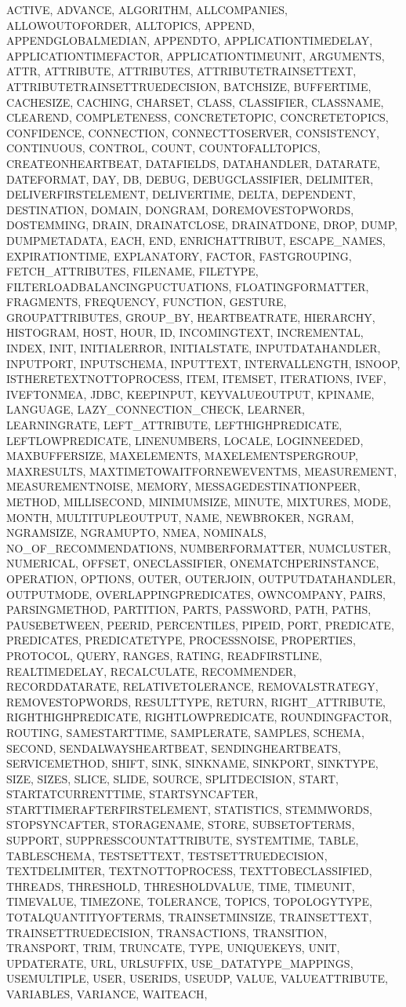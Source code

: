 {{ACTIVE, ADVANCE, ALGORITHM, ALLCOMPANIES, ALLOWOUTOFORDER, ALLTOPICS, APPEND, APPENDGLOBALMEDIAN, APPENDTO, APPLICATIONTIMEDELAY, APPLICATIONTIMEFACTOR, APPLICATIONTIMEUNIT, ARGUMENTS, ATTR, ATTRIBUTE, ATTRIBUTES, ATTRIBUTETRAINSETTEXT, ATTRIBUTETRAINSETTRUEDECISION, BATCHSIZE, BUFFERTIME, CACHESIZE, CACHING, CHARSET, CLASS, CLASSIFIER, CLASSNAME, CLEAREND, COMPLETENESS, CONCRETETOPIC, CONCRETETOPICS, CONFIDENCE, CONNECTION, CONNECTTOSERVER, CONSISTENCY, CONTINUOUS, CONTROL, COUNT, COUNTOFALLTOPICS, CREATEONHEARTBEAT, DATAFIELDS, DATAHANDLER, DATARATE, DATEFORMAT, DAY, DB, DEBUG, DEBUGCLASSIFIER, DELIMITER, DELIVERFIRSTELEMENT, DELIVERTIME, DELTA, DEPENDENT, DESTINATION, DOMAIN, DONGRAM, DOREMOVESTOPWORDS, DOSTEMMING, DRAIN, DRAINATCLOSE, DRAINATDONE, DROP, DUMP, DUMPMETADATA, EACH, END, ENRICHATTRIBUT, ESCAPE_NAMES, EXPIRATIONTIME, EXPLANATORY, FACTOR, FASTGROUPING, FETCH_ATTRIBUTES, FILENAME, FILETYPE, FILTERLOADBALANCINGPUCTUATIONS, FLOATINGFORMATTER, FRAGMENTS, FREQUENCY, FUNCTION, GESTURE, GROUPATTRIBUTES, GROUP_BY, HEARTBEATRATE, HIERARCHY, HISTOGRAM, HOST, HOUR, ID, INCOMINGTEXT, INCREMENTAL, INDEX, INIT, INITIALERROR, INITIALSTATE, INPUTDATAHANDLER, INPUTPORT, INPUTSCHEMA, INPUTTEXT, INTERVALLENGTH, ISNOOP, ISTHERETEXTNOTTOPROCESS, ITEM, ITEMSET, ITERATIONS, IVEF, IVEFTONMEA, JDBC, KEEPINPUT, KEYVALUEOUTPUT, KPINAME, LANGUAGE, LAZY_CONNECTION_CHECK, LEARNER, LEARNINGRATE, LEFT_ATTRIBUTE, LEFTHIGHPREDICATE, LEFTLOWPREDICATE, LINENUMBERS, LOCALE, LOGINNEEDED, MAXBUFFERSIZE, MAXELEMENTS, MAXELEMENTSPERGROUP, MAXRESULTS, MAXTIMETOWAITFORNEWEVENTMS, MEASUREMENT, MEASUREMENTNOISE, MEMORY, MESSAGEDESTINATIONPEER, METHOD, MILLISECOND, MINIMUMSIZE, MINUTE, MIXTURES, MODE, MONTH, MULTITUPLEOUTPUT, NAME, NEWBROKER, NGRAM, NGRAMSIZE, NGRAMUPTO, NMEA, NOMINALS, NO_OF_RECOMMENDATIONS, NUMBERFORMATTER, NUMCLUSTER, NUMERICAL, OFFSET, ONECLASSIFIER, ONEMATCHPERINSTANCE, OPERATION, OPTIONS, OUTER, OUTERJOIN, OUTPUTDATAHANDLER, OUTPUTMODE, OVERLAPPINGPREDICATES, OWNCOMPANY, PAIRS, PARSINGMETHOD, PARTITION, PARTS, PASSWORD, PATH, PATHS, PAUSEBETWEEN, PEERID, PERCENTILES, PIPEID, PORT, PREDICATE, PREDICATES, PREDICATETYPE, PROCESSNOISE, PROPERTIES, PROTOCOL, QUERY, RANGES, RATING, READFIRSTLINE, REALTIMEDELAY, RECALCULATE, RECOMMENDER, RECORDDATARATE, RELATIVETOLERANCE, REMOVALSTRATEGY, REMOVESTOPWORDS, RESULTTYPE, RETURN, RIGHT_ATTRIBUTE, RIGHTHIGHPREDICATE, RIGHTLOWPREDICATE, ROUNDINGFACTOR, ROUTING, SAMESTARTTIME, SAMPLERATE, SAMPLES, SCHEMA, SECOND, SENDALWAYSHEARTBEAT, SENDINGHEARTBEATS, SERVICEMETHOD, SHIFT, SINK, SINKNAME, SINKPORT, SINKTYPE, SIZE, SIZES, SLICE, SLIDE, SOURCE, SPLITDECISION, START, STARTATCURRENTTIME, STARTSYNCAFTER, STARTTIMERAFTERFIRSTELEMENT, STATISTICS, STEMMWORDS, STOPSYNCAFTER, STORAGENAME, STORE, SUBSETOFTERMS, SUPPORT, SUPPRESSCOUNTATTRIBUTE, SYSTEMTIME, TABLE, TABLESCHEMA, TESTSETTEXT, TESTSETTRUEDECISION, TEXTDELIMITER, TEXTNOTTOPROCESS, TEXTTOBECLASSIFIED, THREADS, THRESHOLD, THRESHOLDVALUE, TIME, TIMEUNIT, TIMEVALUE, TIMEZONE, TOLERANCE, TOPICS, TOPOLOGYTYPE, TOTALQUANTITYOFTERMS, TRAINSETMINSIZE, TRAINSETTEXT, TRAINSETTRUEDECISION, TRANSACTIONS, TRANSITION, TRANSPORT, TRIM, TRUNCATE, TYPE, UNIQUEKEYS, UNIT, UPDATERATE, URL, URLSUFFIX, USE_DATATYPE_MAPPINGS, USEMULTIPLE, USER, USERIDS, USEUDP, VALUE, VALUEATTRIBUTE, VARIABLES, VARIANCE, WAITEACH, }}
